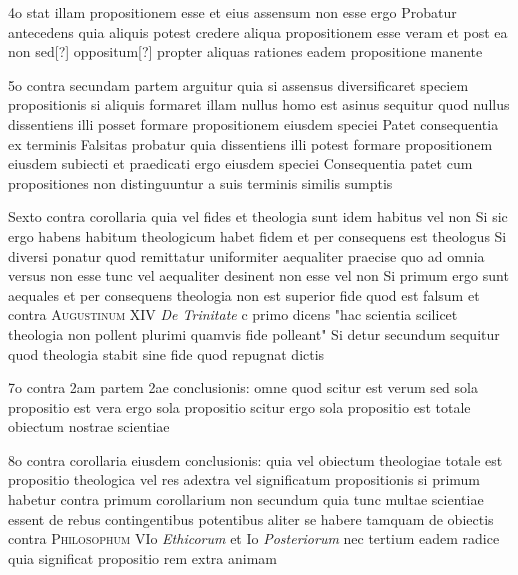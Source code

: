 \documentclass[twoside, openright]{article}
\newcommand{\name}[1]{\textsc{#1}}
\newcommand{\worktitle}[1]{\textit{#1}}
\begin{document}
        \pstart
        4o stat illam propositionem esse et eius assensum non esse ergo Probatur antecedens quia aliquis potest credere aliqua propositionem esse veram et post ea non sed[?] oppositum[?] propter aliquas rationes eadem propositione manente
        \pend
     
        \pstart
        5o contra secundam partem arguitur quia si assensus diversificaret speciem propositionis si aliquis formaret illam nullus homo est asinus sequitur quod nullus dissentiens illi posset formare propositionem eiusdem speciei Patet consequentia ex terminis Falsitas probatur quia dissentiens illi potest formare propositionem eiusdem subiecti et praedicati ergo eiusdem speciei Consequentia patet cum propositiones non distinguuntur a suis terminis similis sumptis
        \pend
     
        \pstart
        Sexto contra corollaria quia vel fides et theologia sunt idem habitus vel non Si sic ergo habens habitum theologicum habet fidem et per consequens est theologus Si diversi ponatur quod remittatur uniformiter aequaliter praecise quo ad omnia versus non esse tunc vel aequaliter desinent non esse vel non Si primum ergo sunt aequales et per consequens theologia non est superior fide quod est falsum et contra \name{Augustinum} XIV \worktitle{De Trinitate} c primo dicens "hac scientia scilicet theologia non pollent plurimi quamvis fide polleant" Si detur secundum sequitur quod theologia stabit sine fide quod repugnat dictis 
        \pend
     
        \pstart
        7o contra 2am partem 2ae conclusionis: omne quod scitur est verum sed sola propositio est vera ergo sola propositio scitur ergo sola propositio est totale obiectum nostrae scientiae
        \pend
     
        \pstart
        8o contra corollaria eiusdem conclusionis: quia vel obiectum theologiae totale est propositio theologica vel res adextra vel significatum propositionis si primum habetur contra primum corollarium non secundum quia tunc multae scientiae essent de rebus contingentibus potentibus aliter se habere tamquam de obiectis contra \name{Philosophum} VIo \worktitle{Ethicorum} et Io \worktitle{Posteriorum} nec tertium eadem radice quia significat propositio rem extra animam 
        \pend
     
\end{document}
